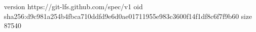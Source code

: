 version https://git-lfs.github.com/spec/v1
oid sha256:d9c981a254b4fbca710ddfd9e6d0ae01711955e983c3600f14f1df8c6f7f9b60
size 87540
